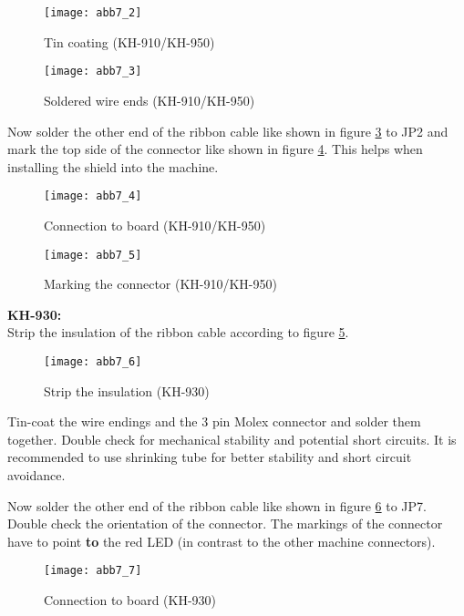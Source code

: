 \documentclass[fleqn,10pt]{SelfArx} %
\begin{document}
\begin{figure}[tbhp]\centering
\texttt{[image: abb7\_2]}
\caption{Tin coating (KH-910/KH-950)}
\label{fig:abb7_2}
\end{figure}

\begin{figure}[tbhp]\centering
\texttt{[image: abb7\_3]}
\caption{Soldered wire ends (KH-910/KH-950)}
\label{fig:abb7_3}
\end{figure}

Now solder the other end of the ribbon cable like shown in figure \ref{fig:abb7_4} to JP2 and mark the top side of the connector like shown in figure \ref{fig:abb7_5}. This helps when installing the shield into the machine.\par

\begin{figure}[tbhp]\centering
\texttt{[image: abb7\_4]}
\caption{Connection to board (KH-910/KH-950)}
\label{fig:abb7_4}
\end{figure}

\begin{figure}[tbhp]\centering
\texttt{[image: abb7\_5]}
\caption{Marking the connector (KH-910/KH-950)}
\label{fig:abb7_5}
\end{figure}

\FloatBarrier

\textbf{KH-930:} \\

Strip the insulation of the ribbon cable according to figure \ref{fig:abb7_6}.

\begin{figure}[tbhp]\centering
\texttt{[image: abb7\_6]}
\caption{Strip the insulation (KH-930)}
\label{fig:abb7_6}
\end{figure}

Tin-coat the wire endings and the 3 pin Molex connector and solder them together. Double check for mechanical stability and potential short circuits. It is recommended to use shrinking tube for better stability and short circuit avoidance.

Now solder the other end of the ribbon cable like shown in figure \ref{fig:abb7_7} to JP7. Double check the orientation of the connector. The markings of the connector have to point \textbf{to} the red LED (in contrast to the other machine connectors).

\begin{figure}[tbhp]\centering
\texttt{[image: abb7\_7]}
\caption{Connection to board (KH-930)}
\label{fig:abb7_7}
\end{figure}
\end{document}
